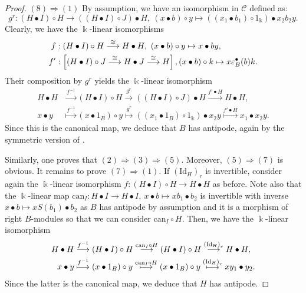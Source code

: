 \documentclass[nosumlimits,twoside]{amsart}
\theoremstyle{definition}
\theoremstyle{remark}
\newcommand{\id}{\mathrm{Id}}
\newcommand{\Cc}{\mathcal{C}}
\begin{document}
\begin{proof}
$(8)\Rightarrow(1)$
By assumption, we have an isomorphism in $\Cc$ defined as:%
\begin{equation*}
g^{r}:(H\bullet I) \circ H%
\longrightarrow \left((H\bullet I) \circ J\right) \bullet H,\ (x\bullet b)\circ y\mapsto ((x_1\bullet b_1)\circ 1_{\Bbbk})\bullet x_2b_2y.
\end{equation*}%
Clearly, we have the $\Bbbk $-linear isomorphisms
\begin{align*}
f&:(H\bullet I)
\circ H\overset{\cong }{\longrightarrow }H\bullet H,\ \left( x\bullet
b\right) \circ y\mapsto x\bullet by,\\
f'&:\left[ (H\bullet I) \circ J\overset{\cong }{\longrightarrow }H\bullet J\overset{\cong }{%
\longrightarrow }H\right] ,\left( x\bullet b\right) \circ k\mapsto x\varepsilon_B^\bullet(b)k.
\end{align*}
Their composition by $g^r$ yields the $\Bbbk$-linear isomorphism
\begin{align*}
H\bullet H&\overset{f^{-1}}{\longrightarrow }(H\bullet I)\circ H%
\overset{g^r}{\longrightarrow }\left( (H\bullet I) \circ J\right) \bullet H\overset{f'\bullet H}{\longrightarrow }%
H\bullet H,\\
x\bullet y&\overset{f^{-1}}{\mapsto }\left( x\bullet 1_{B}\right) \circ y%
\overset{g^r}{\mapsto }\left( \left( x_{1}\bullet 1_{B}\right) \circ 1_{\Bbbk}\right) \bullet
 x_{2}y \overset{f'\bullet H}{\mapsto }x_{1}\bullet 
x_{2}y.
\end{align*}
Since this is the canonical map, we deduce that $B$ has antipode, again by the symmetric version of \cite[Theorem 1.8]{Ve}.

Similarly, one proves that $(2)\Rightarrow(3)\Rightarrow(5)$. Moreover, $(5)\Rightarrow (7)$ is obvious. It remains to prove $(7)\Rightarrow (1)$. If $(\id_H)_r$ is invertible, consider again the $\Bbbk$-linear isomorphism $f:(H\bullet I)\circ
H\rightarrow H\bullet H$ as before. Note also that the $\Bbbk$-linear map $\mathrm{can}_{I}:H\bullet I\rightarrow
H\bullet I,\ x\bullet b\mapsto xb_{1}\bullet b_{2}$ is invertible with inverse
$x\bullet b\mapsto xS\left( b_{1}\right) \bullet b_{2}$ as $B$ has antipode by assumption and it is a morphism of right $B$-modules so that we can consider $\mathrm{can}_I\circ H$. Then, we have the $\Bbbk$-linear isomorphism
\begin{align*}
H\bullet H&\overset{f^{-1}}{\longrightarrow }(H\bullet I)\circ H\overset{\mathrm{can}%
_{I}\circ H}{\longrightarrow }\left( H\bullet I\right) \circ H\overset{%
\left( \mathrm{Id}_{H}\right) _{r}}{\longrightarrow }H\bullet H,\\
x\bullet y&\overset{f^{-1}}{\longmapsto }\left( x\bullet 1_{B}\right) \circ y%
\overset{\mathrm{can}_{I}\circ H}{\longmapsto }\left( x\bullet 1_{B}\right)
\circ y\overset{\left( \mathrm{Id}_{H}\right) _{r}}{\longmapsto }%
xy_{1}\bullet y_{2}.
\end{align*}
Since the latter is the canonical map, we deduce that $H$ has antipode.
\end{proof}
\end{document}
